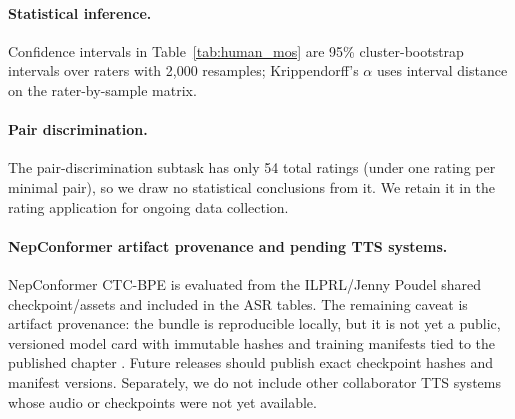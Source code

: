\documentclass[11pt]{article}
\begin{document}
\paragraph{Statistical inference.} Confidence intervals in Table~\ref{tab:human_mos} are 95\% cluster-bootstrap intervals over raters with 2{,}000 resamples; Krippendorff's $\alpha$ uses interval distance on the rater-by-sample matrix.

\paragraph{Pair discrimination.} The pair-discrimination subtask has only 54 total ratings (under one rating per minimal pair), so we draw no statistical conclusions from it. We retain it in the rating application for ongoing data collection.

\paragraph{NepConformer artifact provenance and pending TTS systems.} NepConformer CTC-BPE is evaluated from the ILPRL/Jenny Poudel shared checkpoint/assets and included in the ASR tables. The remaining caveat is artifact provenance: the bundle is reproducible locally, but it is not yet a public, versioned model card with immutable hashes and training manifests tied to the published chapter \citep{poudel2026nepconformer}. Future releases should publish exact checkpoint hashes and manifest versions. Separately, we do not include other collaborator TTS systems whose audio or checkpoints were not yet available.
\end{document}
